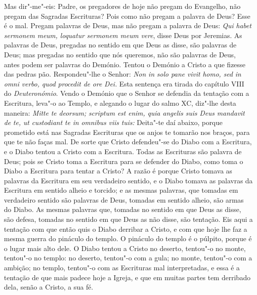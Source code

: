 Mas dir"-me"-eis: Padre, os pregadores de hoje não pregam do Evangelho,
não pregam das Sagradas Escrituras? Pois como não
pregam a palavra de Deus? Esse é o mal. Pregam palavras de Deus, mas
não pregam a palavra de Deus: \emph{Qui habet sermonem meum, loquatur
sermonem meum vere}, disse Deus por Jeremias. As palavras de Deus,
pregadas no sentido em que Deus as disse, são palavras de Deus; mas
pregadas no sentido que nós queremos, não são palavras de Deus, antes
podem ser palavras do Demónio. Tentou o Demónio a Cristo a que fizesse
das pedras pão. Respondeu"-lhe o Senhor: \emph{Non in solo pane vivit
homo, sed in omni verbo, quod procedit de ore Dei.} Esta sentença era
tirada do capítulo VIII do \emph{Deuteronómio}. Vendo o Demónio que o
Senhor se defendia da tentação com a Escritura, leva"-o ao Templo, e
alegando o lugar do salmo XC, diz"-lhe desta maneira: \emph{Mitte te
deorsum; scriptum est enim, quia angelis suis Deus mandavit de te, ut
custodiant te in omnibus viis tuis:} Deita"-te daí abaixo, porque
prometido está nas Sagradas Escrituras que os anjos te tomarão nos
braços, para que te não faças mal. De sorte que Cristo defendeu"-se do
Diabo com a Escritura, e o Diabo tentou a Cristo com a Escritura. Todas
as Escrituras são palavra de Deus; pois se Cristo toma a Escritura para
se defender do Diabo, como toma o Diabo a Escritura para tentar a
Cristo? A razão é porque Cristo tomava as palavras da Escritura em
seu verdadeiro sentido, e o Diabo tomava as palavras da Escritura em
sentido alheio e torcido; e as mesmas palavras, que tomadas em
verdadeiro sentido são palavras de Deus, tomadas em sentido alheio,
são armas do Diabo. As mesmas palavras que, tomadas no sentido em que
Deus as disse, são defesa, tomadas no sentido em que Deus as não disse,
são tentação. Eis aqui a tentação com que então quis o Diabo derribar a
Cristo, e com que hoje lhe faz a mesma guerra do pináculo do templo. O
pináculo do templo é o púlpito, porque é o lugar mais alto dele. O Diabo
tentou a Cristo no deserto, tentou"-o no monte, tentou"-o no templo: no
deserto, tentou"-o com a gula; no monte, tentou"-o com a ambição; no
templo, tentou"-o com as Escrituras mal interpretadas, e essa é a
tentação de que mais padece hoje a Igreja, e que em muitas partes tem
derribado dela, senão a Cristo, a sua fé.

